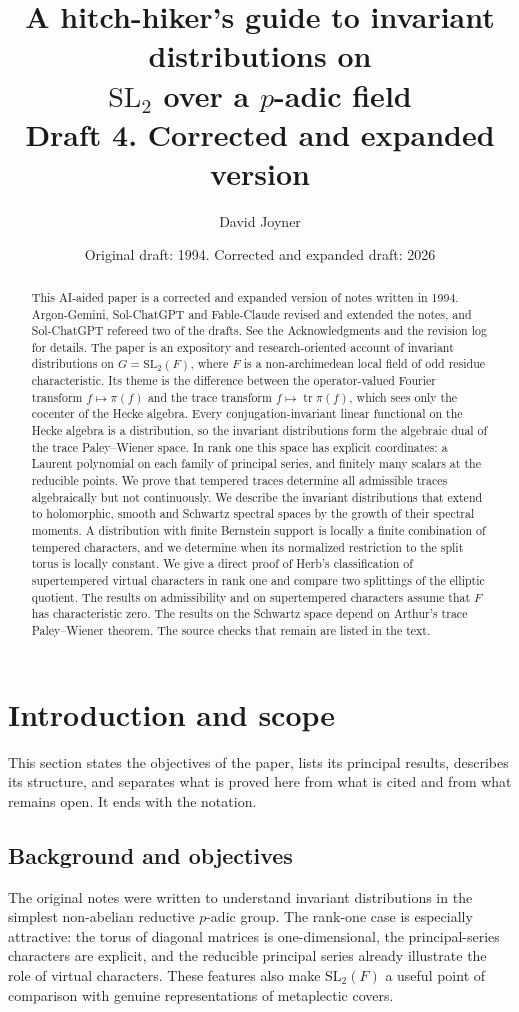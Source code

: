 \documentclass[12pt,letterpaper]{amsart}
\title[A hitch-hiker's guide to invariant distributions]{A hitch-hiker's guide to invariant distributions on \\ $\mathrm{SL}_2$ over a $p$-adic field \\[0.6ex] Draft 4. Corrected and expanded version}
\author{David Joyner}
\date{Original draft: 1994. Corrected and expanded draft: 2026}
\numberwithin{equation}{section}
\theoremstyle{definition}
\theoremstyle{remark}
\newcommand{\tr}{\operatorname{tr}}
\begin{document}
\begin{abstract}
This AI-aided paper is a corrected and expanded version of notes written in 1994. Argon-Gemini, Sol-ChatGPT and Fable-Claude revised and extended the notes, and Sol-ChatGPT refereed two of the drafts. See the Acknowledgments and the revision log for details. The paper is an expository and research-oriented account of invariant distributions on $G=\mathrm{SL}_2(F)$, where $F$ is a non-archimedean local field of odd residue characteristic. Its theme is the difference between the operator-valued Fourier transform $f\mapsto\pi(f)$ and the trace transform $f\mapsto\tr\pi(f)$, which sees only the cocenter of the Hecke algebra. Every conjugation-invariant linear functional on the Hecke algebra is a distribution, so the invariant distributions form the algebraic dual of the trace Paley--Wiener space. In rank one this space has explicit coordinates: a Laurent polynomial on each family of principal series, and finitely many scalars at the reducible points. We prove that tempered traces determine all admissible traces algebraically but not continuously. We describe the invariant distributions that extend to holomorphic, smooth and Schwartz spectral spaces by the growth of their spectral moments. A distribution with finite Bernstein support is locally a finite combination of tempered characters, and we determine when its normalized restriction to the split torus is locally constant. We give a direct proof of Herb's classification of supertempered virtual characters in rank one and compare two splittings of the elliptic quotient. The results on admissibility and on supertempered characters assume that $F$ has characteristic zero. The results on the Schwartz space depend on Arthur's trace Paley--Wiener theorem. The source checks that remain are listed in the text.
\end{abstract}
\maketitle
\tableofcontents

\section{Introduction and scope}\label{sec:intro}
This section states the objectives of the paper, lists its principal results, describes its structure, and separates what is proved here from what is cited and from what remains open. It ends with the notation.

\subsection{Background and objectives}\label{sec:objectives}
The original notes were written to understand invariant distributions in the simplest non-abelian reductive $p$-adic group.  The rank-one case is especially attractive: the torus of diagonal matrices is one-dimensional, the principal-series characters are explicit, and the reducible principal series already illustrate the role of virtual characters.  These features also make $\mathrm{SL}_2(F)$ a useful point of comparison with genuine representations of metaplectic covers.
\end{document}
